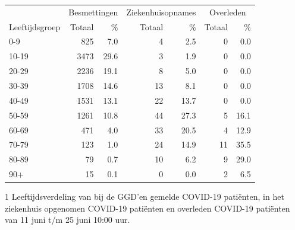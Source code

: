 \documentclass[
  english,
  man,floatsintext]{apa6}
\begin{document}
\begin{table}
\centering\begingroup\fontsize{11}{13}\selectfont

\begin{threeparttable}
\begin{tabular}{lrrrrrr}
\toprule
\multicolumn{1}{c}{ } & \multicolumn{2}{c}{Besmettingen} & \multicolumn{2}{c}{Ziekenhuisopnames} & \multicolumn{2}{c}{Overleden} \\
\cmidrule(l{3pt}r{3pt}){2-3} \cmidrule(l{3pt}r{3pt}){4-5} \cmidrule(l{3pt}r{3pt}){6-7}
Leeftijdsgroep & Totaal & \% & Totaal & \% & Totaal & \%\\
\midrule
0-9 & 825 & 7.0 & 4 & 2.5 & 0 & 0.0\\
10-19 & 3473 & 29.6 & 3 & 1.9 & 0 & 0.0\\
20-29 & 2236 & 19.1 & 8 & 5.0 & 0 & 0.0\\
30-39 & 1708 & 14.6 & 13 & 8.1 & 0 & 0.0\\
40-49 & 1531 & 13.1 & 22 & 13.7 & 0 & 0.0\\
50-59 & 1261 & 10.8 & 44 & 27.3 & 5 & 16.1\\
60-69 & 471 & 4.0 & 33 & 20.5 & 4 & 12.9\\
70-79 & 123 & 1.0 & 24 & 14.9 & 11 & 35.5\\
80-89 & 79 & 0.7 & 10 & 6.2 & 9 & 29.0\\
90+ & 15 & 0.1 & 0 & 0.0 & 2 & 6.5\\
\bottomrule
\end{tabular}
\begin{tablenotes}
\item[1] Leeftijdsverdeling van bij de GGD’en gemelde COVID-19 patiënten, in het ziekenhuis opgenomen COVID-19 patiënten en overleden COVID-19 patiënten van 11 juni t/m 25 juni 10:00 uur.
\end{tablenotes}
\end{threeparttable}
\endgroup{}
\end{table}

\newpage
\end{document}
